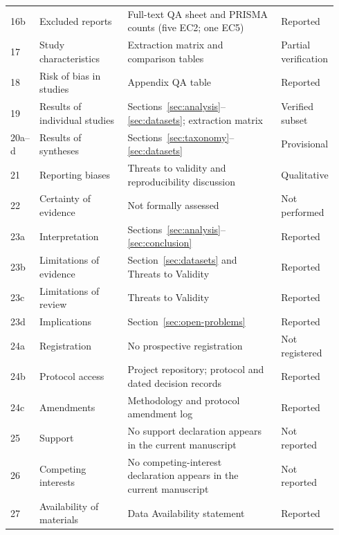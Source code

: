 \begin{longtable}{@{}p{0.06\linewidth}p{0.27\linewidth}p{0.47\linewidth}p{0.14\linewidth}@{}}
16b & Excluded reports & Full-text QA sheet and PRISMA counts (five EC2; one EC5) & Reported \\
17 & Study characteristics & Extraction matrix and comparison tables & Partial verification \\
18 & Risk of bias in studies & Appendix QA table & Reported \\
19 & Results of individual studies & Sections~\ref{sec:analysis}--\ref{sec:datasets}; extraction matrix & Verified subset \\
20a--d & Results of syntheses & Sections~\ref{sec:taxonomy}--\ref{sec:datasets} & Provisional \\
21 & Reporting biases & Threats to validity and reproducibility discussion & Qualitative \\
22 & Certainty of evidence & Not formally assessed & Not performed \\
23a & Interpretation & Sections~\ref{sec:analysis}--\ref{sec:conclusion} & Reported \\
23b & Limitations of evidence & Section~\ref{sec:datasets} and Threats to Validity & Reported \\
23c & Limitations of review & Threats to Validity & Reported \\
23d & Implications & Section~\ref{sec:open-problems} & Reported \\
24a & Registration & No prospective registration & Not registered \\
24b & Protocol access & Project repository; protocol and dated decision records & Reported \\
24c & Amendments & Methodology and protocol amendment log & Reported \\
25 & Support & No support declaration appears in the current manuscript & Not reported \\
26 & Competing interests & No competing-interest declaration appears in the current manuscript & Not reported \\
27 & Availability of materials & Data Availability statement & Reported \\
\bottomrule
\end{longtable}
\normalsize
